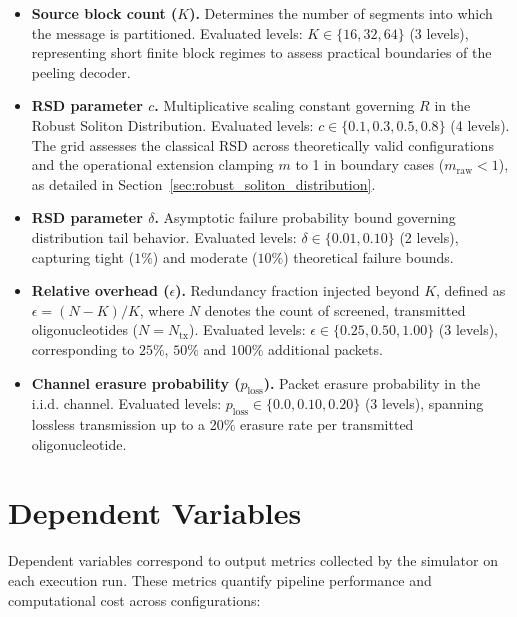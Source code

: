 \begin{itemize}
    \item \textbf{Source block count ($K$).} Determines the number of segments into which the message is partitioned. Evaluated levels: $K \in \{16, 32, 64\}$ (3 levels), representing short finite block regimes to assess practical boundaries of the peeling decoder.

    \item \textbf{RSD parameter $c$.} Multiplicative scaling constant governing $R$ in the Robust Soliton Distribution. Evaluated levels: $c \in \{0.1, 0.3, 0.5, 0.8\}$ (4 levels). The grid assesses the classical RSD across theoretically valid configurations and the operational extension clamping $m$ to 1 in boundary cases ($m_{\text{raw}} < 1$), as detailed in Section~\ref{sec:robust_soliton_distribution}.

    \item \textbf{RSD parameter $\delta$.} Asymptotic failure probability bound governing distribution tail behavior. Evaluated levels: $\delta \in \{0.01, 0.10\}$ (2 levels), capturing tight ($1\%$) and moderate ($10\%$) theoretical failure bounds.

    \item \textbf{Relative overhead ($\epsilon$).} Redundancy fraction injected beyond $K$, defined as $\epsilon = (N - K) / K$, where $N$ denotes the count of screened, transmitted oligonucleotides ($N = N_{\text{tx}}$). Evaluated levels: $\epsilon \in \{0.25, 0.50, 1.00\}$ (3 levels), corresponding to $25\%$, $50\%$ and $100\%$ additional packets.

    \item \textbf{Channel erasure probability ($p_{\text{loss}}$).} Packet erasure probability in the i.i.d. channel. Evaluated levels: $p_{\text{loss}} \in \{0.0, 0.10, 0.20\}$ (3 levels), spanning lossless transmission up to a 20\% erasure rate per transmitted oligonucleotide.
\end{itemize}

\section{Dependent Variables}
\label{sec:dependent_variables}

Dependent variables correspond to output metrics collected by the simulator on each execution run. These metrics quantify pipeline performance and computational cost across configurations:

